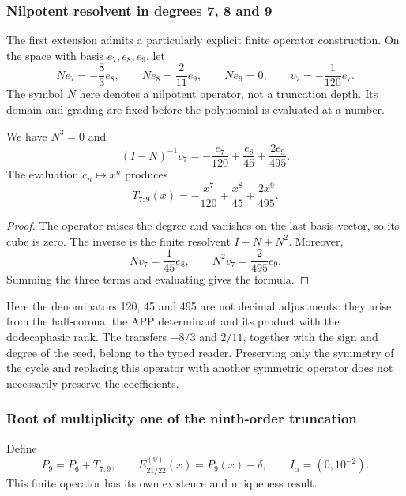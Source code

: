 \subsubsection{Nilpotent resolvent in degrees 7, 8 and 9}
\label{subsec:alpha-resolvente}

The first extension admits a particularly explicit finite operator
construction. On the space with basis \(e_7,e_8,e_9\),
let
\[
 Ne_7=-\frac83e_8,\qquad Ne_8=\frac2{11}e_9,\qquad Ne_9=0,
 \qquad v_7=-\frac1{120}e_7.
\]
The symbol \(N\) here denotes a nilpotent operator, not a truncation
depth. Its domain and grading are fixed before the polynomial
is evaluated at a number.

\begin{lemma}
\label{lem:alpha-resolvente}
We have \(N^3=0\) and
\[
 (I-N)^{-1}v_7
 =-\frac{e_7}{120}+\frac{e_8}{45}+\frac{2e_9}{495}.
\]
The evaluation \(e_n\mapsto x^n\) produces
\begin{equation}
 T_{7:9}(x)=-\frac{x^7}{120}+\frac{x^8}{45}+\frac{2x^9}{495}.
 \label{eq:alpha-t79}
\end{equation}
\end{lemma}

\begin{proof}
The operator raises the degree and vanishes on the last basis vector,
so its cube is zero. The inverse is the finite resolvent
\(I+N+N^2\). Moreover,
\[
 Nv_7=\frac1{45}e_8,\qquad N^2v_7=\frac2{495}e_9.
\]
Summing the three terms and evaluating gives the formula.
\end{proof}

Here the denominators 120, 45 and 495 are not decimal adjustments: they arise
from the half-corona, the APP determinant and its product with the dodecaphasic
rank. The transfers \(-8/3\) and \(2/11\), together with the
sign and degree of the seed, belong to the typed reader. Preserving
only the symmetry of the cycle and replacing this operator with another symmetric
operator does not necessarily preserve the coefficients.

\subsubsection{Root of multiplicity one of the ninth-order truncation}
\label{subsec:alpha-jet}

Define
\[
 P_9=P_6+T_{7:9},\qquad E_{21/22}^{(9)}(x)=P_9(x)-\delta,
 \qquad I_\alpha=(0,10^{-2}).
\]
This finite operator has its own existence and uniqueness result.


